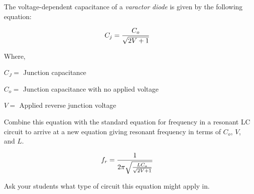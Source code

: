

The voltage-dependent capacitance of a {\it varactor diode} is given by the following equation:

$$C_j = {C_o \over {\sqrt{2V + 1}}}$$

\noindent
Where,

$C_J =$ Junction capacitance

$C_o =$ Junction capacitance with no applied voltage

$V = $ Applied reverse junction voltage 

\vskip 10pt

Combine this equation with the standard equation for frequency in a resonant LC circuit to arrive at a new equation giving resonant frequency in terms of $C_o$, $V$, and $L$.







$$f_r = { 1 \over {2 \pi \sqrt{ {L C_o} \over {\sqrt{2V + 1}}}}}$$







Ask your students what type of circuit this equation might apply in.




